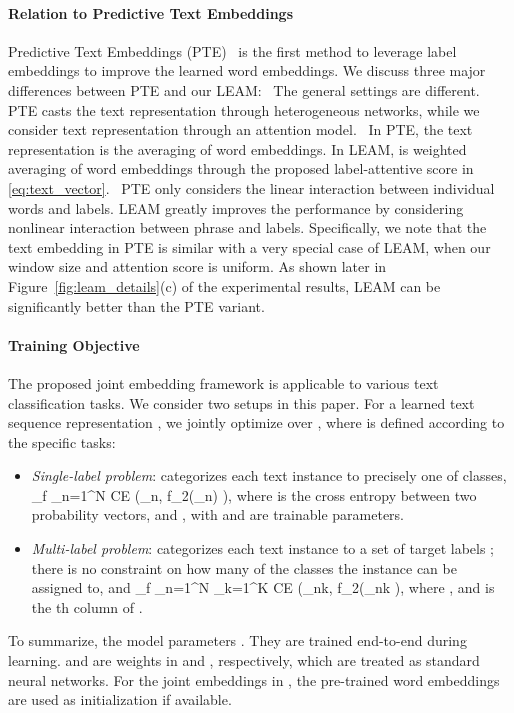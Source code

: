 \documentclass[11pt,a4paper]{article}
\newcommand{\beq}{\vspace{0mm}}
\newcommand{\yv}{\boldsymbol{y}}
\newcommand{\zv}{\boldsymbol{z}}
\newcommand{\Fcal}{\mathcal{F}}
\begin{document}
\paragraph{Relation to Predictive Text Embeddings} 
Predictive Text Embeddings (PTE)~\citep{tang2015pte} is the first method to leverage label embeddings to improve the learned word embeddings. We discuss three major differences between PTE and our LEAM: 
~The general settings are different. PTE casts the text representation through heterogeneous networks, while we consider text representation through an attention model.
~In PTE, the text representation  is the averaging of word embeddings. In LEAM,  is weighted averaging of word embeddings through the proposed label-attentive score in \eqref{eq:text_vector}.
~PTE only considers the linear interaction between individual words and labels. LEAM greatly improves the performance by considering nonlinear interaction between phrase and labels. 
Specifically, we note that the text embedding in PTE is similar with a very special case of LEAM, when our window size  and attention score  is uniform. As shown later in Figure~\ref{fig:leam_details}(c) of the experimental results, LEAM can be significantly better than the PTE variant.


\paragraph{Training Objective}
The proposed joint embedding framework is applicable to various text classification tasks. We consider two setups in this paper. For a learned text sequence representation , we jointly optimize  over , where  is defined according to the specific tasks:
\begin{itemize}
	\item {\em Single-label problem}: categorizes each text instance to precisely one of  classes, 
	\beq
	\min_{f \in \Fcal}  \sum_{n=1}^{N}
	\mbox{CE} (\yv_{n}, f_2(\zv_{n}) ),
	\label{eq:objective_multiclass}
	\eeq
	where  is the cross entropy between two probability vectors, 
	and , with  
	and  are trainable parameters.
\item {\em Multi-label problem}: categorizes each text instance to a set of  target labels ; there is no constraint on how many of the classes the instance can be assigned to, and
	\beq
	\min_{f \in \Fcal}  \sum_{n=1}^{N}  \sum_{k=1}^{K} 
	\mbox{CE} (\yv_{nk}, f_{2}(\zv_{nk} ),
	\label{eq:objective_multilabel}
	\eeq
where , and  is the th column of .
\end{itemize}
To summarize, the model parameters 
. They are trained end-to-end during learning.  and  are weights in  and , respectively, which are treated as standard neural networks. For the joint embeddings  in , the pre-trained word embeddings are used as initialization if available.
\end{document}
